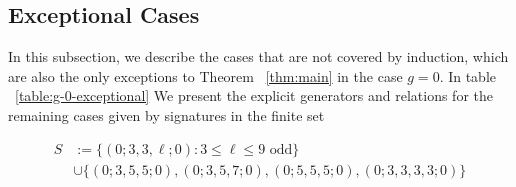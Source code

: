 \documentclass{amsart}
\theoremstyle{plain}
\theoremstyle{definition}
\theoremstyle{remark}
\numberwithin{equation}{section}
\newcommand\ssec{\subsection}
\newcommand\sx{\mathscr X}
\begin{document}



\ssec{Exceptional Cases}
\label{ssec:g-0-exceptional}
In this subsection, we describe the cases that are not covered by induction, which are also the only exceptions to Theorem ~\ref{thm:main} in the case $g = 0$.
In table ~\ref{table:g-0-exceptional} We present the explicit generators and relations for the remaining
cases given by signatures in the finite set

\begin{align*}
	S &:= \{(0; 3, 3, \ell; 0) : 3 \leq \ell \leq 9 \text{ odd}\} \\
		&\cup \{(0; 3, 5, 5; 0) ,(0; 3, 5, 7; 0), (0; 5, 5, 5; 0), (0; 3, 3, 3, 3; 0)\}
\end{align*}
\end{document}
